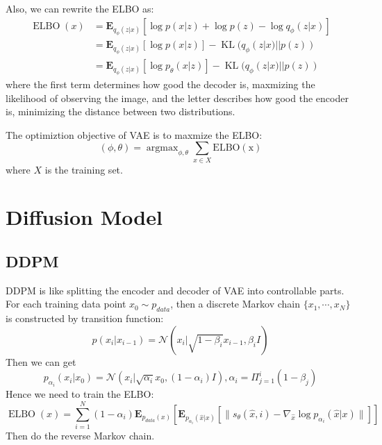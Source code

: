 \begin{theorem}
    Also, we can rewrite the ELBO as:
    \begin{equation}
        \begin{aligned}
            \operatorname{ELBO}(x) &= \mathbf{E}_{q_\phi(z|x)}\left[\log p(x|z)+\log p(z)-\log q_\phi(z|x)\right]\\
            &= \mathbf{E}_{q_\phi(z|x)}\left[\log p(x|z)\right] - \operatorname{KL}(q_\phi(z|x)||p(z))\\
            &= \mathbf{E}_{q_\phi(z|x)}\left[\log p_\theta(x|z)\right] - \operatorname{KL}(q_\phi(z|x)||p(z))
        \end{aligned}
    \end{equation}
    where the first term determines how good the decoder is, maxmizing the likelihood of observing the image, 
    and the letter describes how good the encoder is, minimizing the distance between two distributions.
\end{theorem}

\begin{definition}
    The optimiztion objective of VAE is to maxmize the ELBO:
    \begin{equation}
        (\phi, \theta) = \operatorname{argmax}_{\phi, \theta} \sum_{x\in X} \operatorname{ELBO(x)}
    \end{equation}
    where $X$ is the training set.
\end{definition}
\section{Diffusion Model}

\subsection{DDPM}
DDPM is like splitting the encoder and decoder of VAE into controllable parts. 
For each training data point $x_0\sim p_{data}$, then a discrete Markov chain $\{x_1, \cdots, x_N\}$ is constructed by transition function:
\begin{equation}
    p(x_i|x_{i-1})=\mathcal{N}(x_i|\sqrt{1-\beta_i}x_{i-1}, \beta_i I)
\end{equation}
Then we can get 
\begin{equation}
    p_{\alpha_i}(x_i|x_0) = \mathcal{N}(x_i|\sqrt{\alpha_i}x_0, (1-\alpha_i)I), \alpha_i = \Pi_{j=1}^i(1-\beta_j)
\end{equation}
Hence we need to train the ELBO:
\begin{equation}
    \operatorname{ELBO}(x) = \sum_{i=1}^N(1-\alpha_i)\mathbf{E}_{p_{data}(x)}\left[\mathbf{E}_{p_{\alpha_i}(\hat{x}|x)}\left[\|s_\theta(\hat{x}, i) - \nabla_{\hat{x}}\log p_{\alpha_i}(\hat{x}|x)\|\right]\right]
\end{equation}
Then do the reverse Markov chain.

